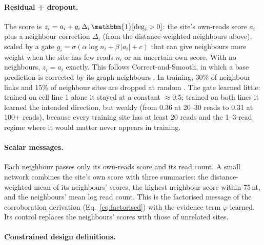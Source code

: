 \documentclass[11pt,a4paper]{article}
\begin{document}
\paragraph{Residual + dropout.} The score is
$z_i=a_i+g_i\,\Delta_i\,\mathbbm{1}[\deg_i>0]$: the site's own-reads score
$a_i$ plus a neighbour correction $\Delta_i$ (from the distance-weighted
neighbours above), scaled by a gate
$g_i=\sigma(\alpha\log n_i+\beta\,|a_i|+c)$ that can give neighbours more
weight when the site has few reads $n_i$ or an uncertain own score. With no
neighbours, $z_i=a_i$ exactly. This follows Correct-and-Smooth, in which a
base prediction is corrected by its graph neighbours \citep{huang2021}. In
training, 30\% of neighbour links and 15\% of neighbour sites are dropped at
random \citep{feng2020,rong2020}. The gate learned little: trained on cell
line 1 alone it stayed at a constant $\approx$0.5; trained on both lines it
learned the intended direction, but weakly (from 0.36 at 20--30 reads to 0.31
at 100+ reads), because every training site has at least 20 reads and the
1--3-read regime where it would matter never appears in training.

\paragraph{Scalar messages.} Each neighbour passes only its own-reads score
and its read count. A small network combines the site's own score with three
summaries: the distance-weighted mean of its neighbours' scores, the highest
neighbour score within 75\,nt, and the neighbours' mean log read count. This
is the factorised message of the corroboration derivation (Eq.~\eqref{eq:factorised})
with the evidence term $\varphi$ learned. Its control replaces the
neighbours' scores with those of unrelated sites.

\paragraph{Constrained design definitions.}
\end{document}

